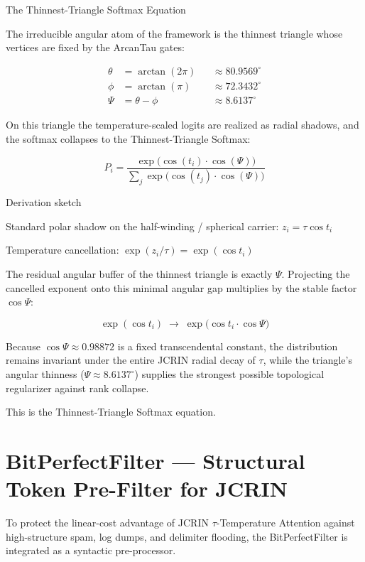 The Thinnest-Triangle Softmax Equation

The irreducible angular atom of the framework is the thinnest triangle whose vertices are fixed by the ArcanTau gates:

\[
\begin{align*}
\theta &= \arctan(2\pi) &&\approx 80.9569^\circ \\
\phi  &= \arctan(\pi)  &&\approx 72.3432^\circ \\
\Psi  &= \theta - \phi &&\approx 8.6137^\circ
\end{align*}
\]

On this triangle the temperature-scaled logits are realized as radial shadows, and the softmax collapses to the Thinnest-Triangle Softmax:

\[
\boxed{
P_i
=
\frac{
\exp\bigl(
\cos(t_i)
\cdot
\cos(\Psi)
\bigr)
}{
\sum_j
\exp\bigl(
\cos(t_j)
\cdot
\cos(\Psi)
\bigr)
}
}
\]

Derivation sketch

Standard polar shadow on the half-winding / spherical carrier:  
   \(z_i = \tau\cos t_i\)

Temperature cancellation:  
   \(\displaystyle\exp(z_i/\tau) = \exp(\cos t_i)\)

The residual angular buffer of the thinnest triangle is exactly \(\Psi\).  
   Projecting the cancelled exponent onto this minimal angular gap multiplies by the stable factor \(\cos\Psi\):

\[
\exp(\cos t_i)\;\longrightarrow\;
\exp\bigl(\cos t_i\cdot\cos\Psi\bigr)
\]

Because \(\cos\Psi\approx 0.98872\) is a fixed transcendental constant, the distribution remains invariant under the entire JCRIN radial decay of \(\tau\), while the triangle’s angular thinness (\(\Psi\approx 8.6137^\circ\)) supplies the strongest possible topological regularizer against rank collapse.

This is the Thinnest-Triangle Softmax equation.


\section*{BitPerfectFilter — Structural Token Pre-Filter for JCRIN}

To protect the linear-cost advantage of JCRIN \(\tau\)-Temperature Attention against high-structure spam, log dumps, and delimiter flooding, the BitPerfectFilter is integrated as a syntactic pre-processor.

